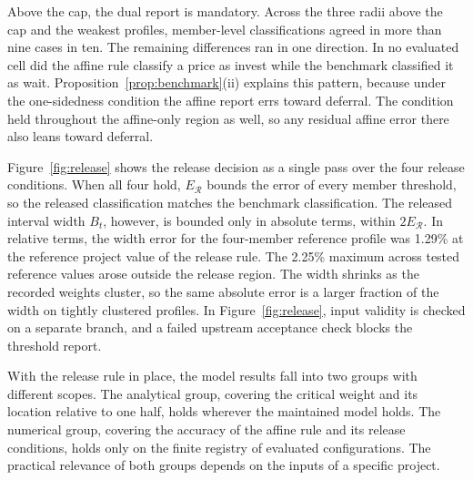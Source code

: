 \documentclass[5p,times,authoryear]{elsarticle}
\theoremstyle{plain}
\newcommand{\ER}{E_{\mathcal{R}}}
\begin{document}
Above the cap, the dual report is mandatory. Across the three radii above the cap and the weakest profiles, member-level classifications agreed in more than nine cases in ten. The remaining differences ran in one direction. In no evaluated cell did the affine rule classify a price as invest while the benchmark classified it as wait. Proposition~\ref{prop:benchmark}(ii) explains this pattern, because under the one-sidedness condition the affine report errs toward deferral. The condition held throughout the affine-only region as well, so any residual affine error there also leans toward deferral.

Figure~\ref{fig:release} shows the release decision as a single pass over the four release conditions. When all four hold, $\ER$ bounds the error of every member threshold, so the released classification matches the benchmark classification. The released interval width $B_t$, however, is bounded only in absolute terms, within $2\ER$. In relative terms, the width error for the four-member reference profile was 1.29\% at the reference project value of the release rule. The 2.25\% maximum across tested reference values arose outside the release region. The width shrinks as the recorded weights cluster, so the same absolute error is a larger fraction of the width on tightly clustered profiles. In Figure~\ref{fig:release}, input validity is checked on a separate branch, and a failed upstream acceptance check blocks the threshold report.

With the release rule in place, the model results fall into two groups with different scopes. The analytical group, covering the critical weight and its location relative to one half, holds wherever the maintained model holds. The numerical group, covering the accuracy of the affine rule and its release conditions, holds only on the finite registry of evaluated configurations. The practical relevance of both groups depends on the inputs of a specific project.
\end{document}
